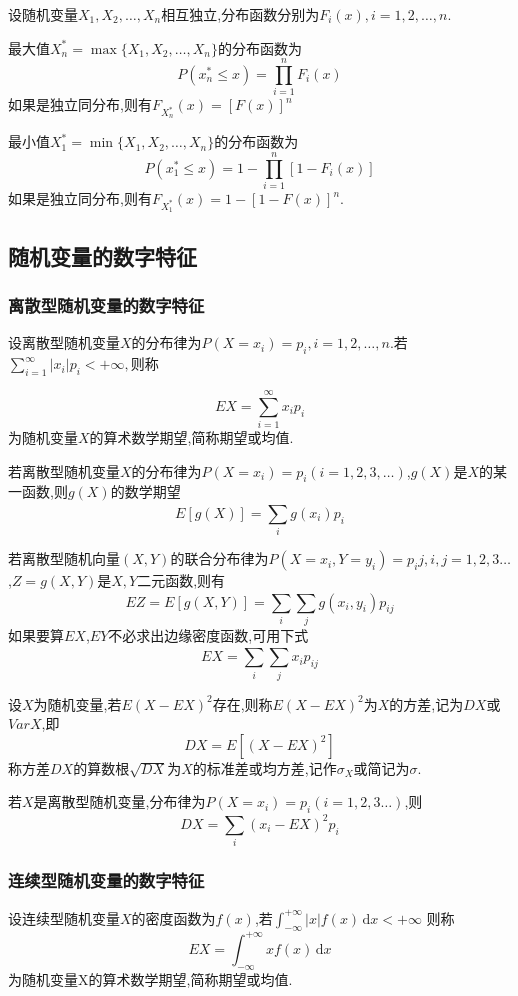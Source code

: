 设随机变量$X_1,X_2,\dotsc,X_n$相互独立,分布函数分别为$F_i(x),i=1,2,\dotsc,n$.

最大值$X^*_n=\max\{X_1,X_2,\dotsc,X_n\} $的分布函数为
\begin{equation*}
    P(x^*_n \leqslant x)= \prod _{i=1}^{n}F_i(x)
\end{equation*}
如果是独立同分布,则有$F_{X_n^*}(x)=[F(x)]^n$

最小值$X_1^*=\min\{X_1,X_2,\dotsc,X_n\}$的分布函数为
\begin{equation*}
    P(x_1^* \leqslant x)=1-\prod_{i=1}^{n}\left[1-F_i(x)\right] 
\end{equation*}
如果是独立同分布,则有$F_{X_1^*}(x)=1-[1-F(x)]^n$.
\subsection{随机变量的数字特征}
\subsubsection{离散型随机变量的数字特征} 
\begin{definition}
    设离散型随机变量$X$的分布律为$P(X=x_i)=p_i,i=1,2,\dots,n.$若$\sum^\infty_{i=1}\left\lvert x_i \right\rvert p_i<+\infty,$则称

    \[
    EX=\sum^\infty_{i=1}x_ip_i
    \]
    为随机变量$X$的算术数学期望,简称期望或均值.
\end{definition}

    若离散型随机变量$X$的分布律为$P(X=x_i)=p_i(i=1,2,3,\dots)$,$g(X)$是$X$的某一函数,则$g(X)$的数学期望\[
        E[g(X)]=\sum^{}_{i}g(x_i)p_i\]

    若离散型随机向量$(X,Y)$的联合分布律为$P(X=x_i,Y=y_i)=p_ij,i,j=1,2,3\dots$,$Z=g(X,Y)$是$X,Y$二元函数,则有\[
        EZ=E[g(X,Y)]=\sum^{}_{i}\sum^{}_{j}g(x_i,y_i)p_{ij}\]
        如果要算$EX$,$EY$不必求出边缘密度函数,可用下式\[
        EX=\sum^{}_{i}\sum^{}_{j}x_ip_{ij}\]

\begin{definition}
    设$X$为随机变量,若$E(X-EX)^2$存在,则称$E(X-EX)^2$为$X$的方差,记为$DX$或$VarX$,即\[DX=E\left[(X-EX)^2\right] \]称方差$DX$的算数根$\sqrt{DX}$为$X$的标准差或均方差,记作$\sigma_X$或简记为$\sigma$.
\end{definition}

若$X$是离散型随机变量,分布律为$P(X=x_i)=p_i(i=1,2,3\dots)$,则\[DX=\sum^{}_{i}(x_i-EX)^2p_i\]
\subsubsection{连续型随机变量的数字特征} 
\begin{definition}
    设连续型随机变量$X$的密度函数为$f(x)$,若$\int_{-\infty}^{+\infty}\left\lvert x \right\rvert f(x)  \,\mathrm{d} x<+\infty$ 则称
    \[
    EX=\int_{-\infty}^{+\infty}xf(x)  \,\mathrm{d} x 
    \]为随机变量X的算术数学期望,简称期望或均值.
\end{definition}

